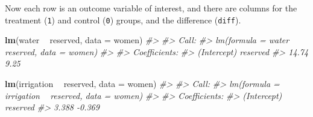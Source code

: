 \documentclass[]{book}
\newenvironment{Shaded}{\begin{snugshade}}{\end{snugshade}}
\newcommand{\KeywordTok}[1]{\textcolor[rgb]{0.13,0.29,0.53}{\textbf{#1}}}
\newcommand{\DataTypeTok}[1]{\textcolor[rgb]{0.13,0.29,0.53}{#1}}
\newcommand{\StringTok}[1]{\textcolor[rgb]{0.31,0.60,0.02}{#1}}
\newcommand{\CommentTok}[1]{\textcolor[rgb]{0.56,0.35,0.01}{\textit{#1}}}
\newcommand{\OperatorTok}[1]{\textcolor[rgb]{0.81,0.36,0.00}{\textbf{#1}}}
\newcommand{\NormalTok}[1]{#1}
\theoremstyle{definition}
\theoremstyle{definition}
\theoremstyle{definition}
\theoremstyle{remark}
\begin{document}
\begin{Shaded}
\end{Shaded}

Now each row is an outcome variable of interest, and there are columns
for the treatment (\texttt{1}) and control (\texttt{0}) groups, and the
difference (\texttt{diff}).

\begin{Shaded}
\begin{Highlighting}[]
\KeywordTok{lm}\NormalTok{(water }\OperatorTok{~}\StringTok{ }\NormalTok{reserved, }\DataTypeTok{data =}\NormalTok{ women)}
\CommentTok{#> }
\CommentTok{#> Call:}
\CommentTok{#> lm(formula = water ~ reserved, data = women)}
\CommentTok{#> }
\CommentTok{#> Coefficients:}
\CommentTok{#> (Intercept)     reserved  }
\CommentTok{#>       14.74         9.25}
\end{Highlighting}
\end{Shaded}

\begin{Shaded}
\begin{Highlighting}[]
\KeywordTok{lm}\NormalTok{(irrigation }\OperatorTok{~}\StringTok{ }\NormalTok{reserved, }\DataTypeTok{data =}\NormalTok{ women)}
\CommentTok{#> }
\CommentTok{#> Call:}
\CommentTok{#> lm(formula = irrigation ~ reserved, data = women)}
\CommentTok{#> }
\CommentTok{#> Coefficients:}
\CommentTok{#> (Intercept)     reserved  }
\CommentTok{#>       3.388       -0.369}
\end{Highlighting}
\end{Shaded}
\end{document}
